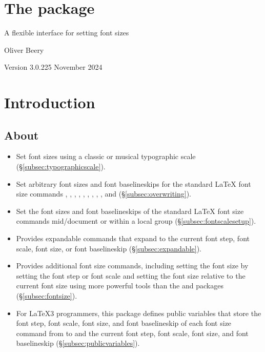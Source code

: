 \documentclass{beery}
\begin{document}
\section*
  {%
    The  package%
  }

A flexible interface for setting font sizes

Oliver Beery

Version 3.0.2\quad{}25 November 2024


\section{Introduction}
\label{sec:intro}

\subsection{About}
\label{subsec:about}

\begin{itemize}
  \item
  Set font sizes using a classic or musical typographic scale (\S\ref{subsec:typographicscale}).
  \item
  Set arbitrary font sizes and font baselineskips for the standard \LaTeX{} font size commands , , , , , , , , , and  (\S\ref{subsec:overwriting}).
  \item
  Set the font sizes and font baselineskips of the standard \LaTeX{} font size commands mid\-/document or within a local group (\S\ref{subsec:fontscalesetup}).
  \item
  Provides expandable commands that expand to the current font step, font scale, font size, or font baselineskip (\S\ref{subsec:expandable}).
  \item
  Provides additional font size commands, including setting the font size by setting the font step or font scale and setting the font size relative to the current font size using more powerful tools than the  and  packages (\S\ref{subsec:fontsize}).
  \item
  For \LaTeX3 programmers, this package defines public  variables that store the font step, font scale, font size, and font baselineskip of each font size command from  to  and the current font step, font scale, font size, and font baselineskip (\S\ref{subsec:publicvariables}).
\end{itemize}
\end{document}
